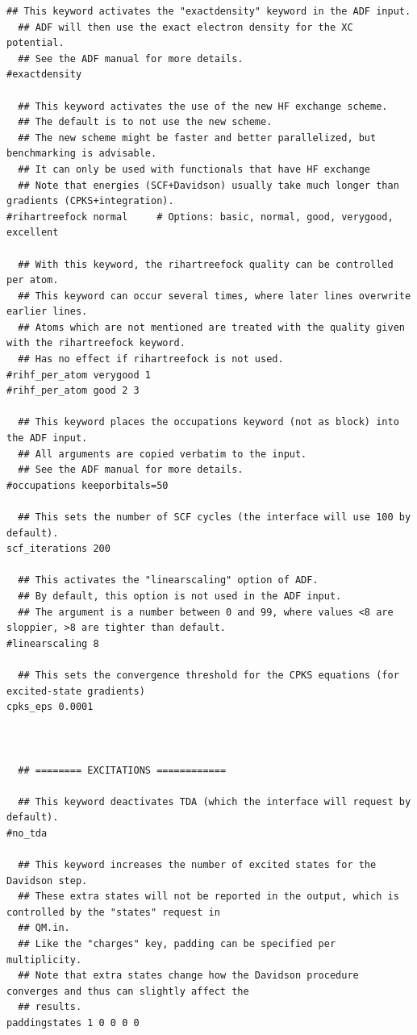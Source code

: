 \documentclass[a4paper,11pt,DIV=15,openany]{scrbook}
\begin{document}
\begin{oframed}
\begin{Verbatim}[commandchars=\\\{\}]
  ## This keyword activates the "exactdensity" keyword in the ADF input.
  ## ADF will then use the exact electron density for the XC potential.
  ## See the ADF manual for more details.
#exactdensity

  ## This keyword activates the use of the new HF exchange scheme.
  ## The default is to not use the new scheme.
  ## The new scheme might be faster and better parallelized, but benchmarking is advisable.
  ## It can only be used with functionals that have HF exchange
  ## Note that energies (SCF+Davidson) usually take much longer than gradients (CPKS+integration).
#rihartreefock normal     # Options: basic, normal, good, verygood, excellent

  ## With this keyword, the rihartreefock quality can be controlled per atom.
  ## This keyword can occur several times, where later lines overwrite earlier lines.
  ## Atoms which are not mentioned are treated with the quality given with the rihartreefock keyword.
  ## Has no effect if rihartreefock is not used.
#rihf_per_atom verygood 1
#rihf_per_atom good 2 3

  ## This keyword places the occupations keyword (not as block) into the ADF input.
  ## All arguments are copied verbatim to the input.
  ## See the ADF manual for more details.
#occupations keeporbitals=50

  ## This sets the number of SCF cycles (the interface will use 100 by default).
scf_iterations 200

  ## This activates the "linearscaling" option of ADF.
  ## By default, this option is not used in the ADF input.
  ## The argument is a number between 0 and 99, where values <8 are sloppier, >8 are tighter than default.
#linearscaling 8

  ## This sets the convergence threshold for the CPKS equations (for excited-state gradients)
cpks_eps 0.0001



  ## ======== EXCITATIONS ============

  ## This keyword deactivates TDA (which the interface will request by default).
#no_tda

  ## This keyword increases the number of excited states for the Davidson step.
  ## These extra states will not be reported in the output, which is controlled by the "states" request in 
  ## QM.in.
  ## Like the "charges" key, padding can be specified per multiplicity.
  ## Note that extra states change how the Davidson procedure converges and thus can slightly affect the 
  ## results.
paddingstates 1 0 0 0 0


\end{Verbatim}
\end{oframed}
\end{document}
